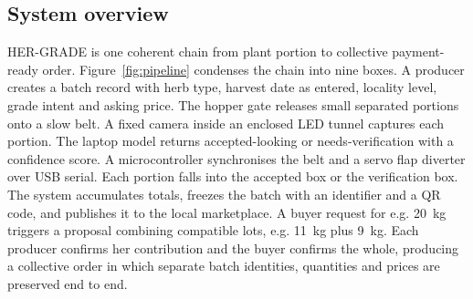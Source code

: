 \documentclass[10pt,conference,a4paper]{IEEEtran}
\begin{document}
\subsection{System overview}
HER-GRADE is one coherent chain from plant portion to collective payment-ready order. Figure~\ref{fig:pipeline} condenses the chain into nine boxes. A producer creates a batch record with herb type, harvest date as entered, locality level, grade intent and asking price. The hopper gate releases small separated portions onto a slow belt. A fixed camera inside an enclosed LED tunnel captures each portion. The laptop model returns accepted-looking or needs-verification with a confidence score. A microcontroller synchronises the belt and a servo flap diverter over USB serial. Each portion falls into the accepted box or the verification box. The system accumulates totals, freezes the batch with an identifier and a QR code, and publishes it to the local marketplace. A buyer request for e.g. 20~kg triggers a proposal combining compatible lots, e.g. 11~kg plus 9~kg. Each producer confirms her contribution and the buyer confirms the whole, producing a collective order in which separate batch identities, quantities and prices are preserved end to end.
\end{document}

